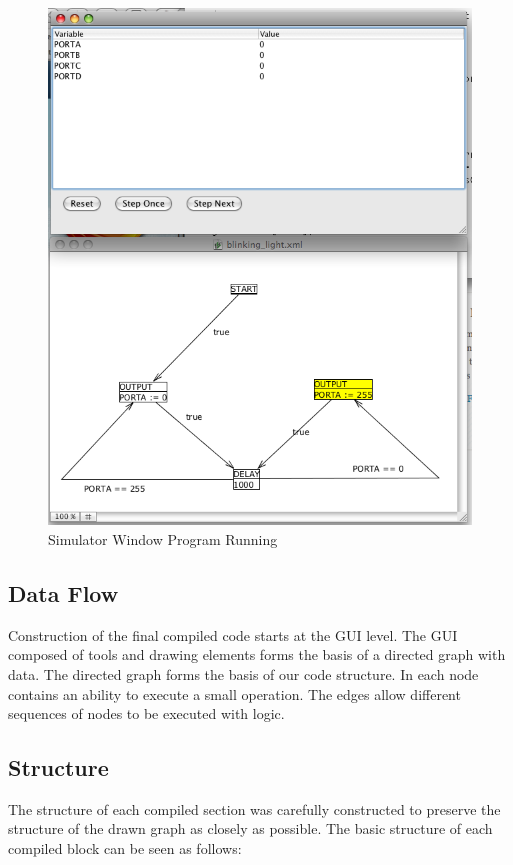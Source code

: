 \begin{figure}[htp]
    \centering
    \includegraphics[width=\imgmedium]{./images/plcedit_simulator_running.png}
    \caption{Simulator Window Program Running}
    \label{fig:plcedit_simulator_running}
\end{figure}





\subsection{Data Flow}
Construction of the final compiled code starts at the GUI level. The GUI composed of tools and drawing elements forms the basis of a directed graph with data. The directed graph forms the basis of our code structure. In each node contains an ability to execute a small operation. The edges allow different sequences of nodes to be executed with logic.

\subsection{Structure}
\label{sec:implementation:struct}
The structure of each compiled section was carefully constructed to preserve the structure of the drawn graph as closely as possible. The basic structure of each compiled block can be seen as follows:

